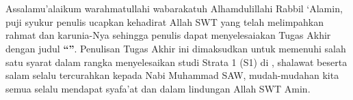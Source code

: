 %
%
%
%

\chapter*{\kataPengantar}

Assalamu’alaikum warahmatullahi wabarakatuh
Alhamdulillahi Rabbil ‘Alamin, puji syukur penulis ucapkan kehadirat Allah SWT yang telah melimpahkan rahmat dan karunia-Nya sehingga penulis dapat menyelesaiakan Tugas Akhir dengan judul \textbf{“\judulkecil”}. Penulisan Tugas Akhir ini dimaksudkan untuk memenuhi salah satu syarat dalam rangka menyelesaikan studi Strata 1 (S1) di \universitas, shalawat beserta salam selalu tercurahkan kepada Nabi Muhammad SAW, mudah-mudahan kita semua selalu mendapat syafa’at dan dalam lindungan Allah SWT Amin.

